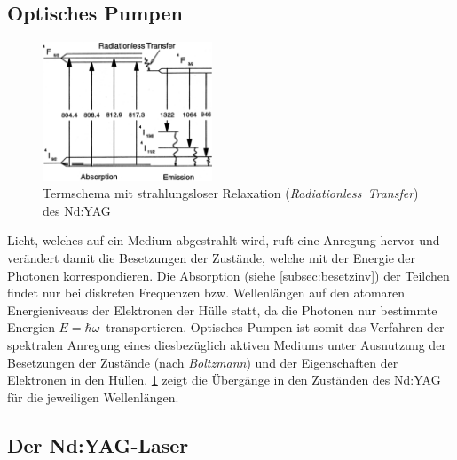 \documentclass[numbers=noenddot,12pt,a4paper]{scrartcl}
\newcommand{\tilt}[1]{\mbox{\textit{#1}}}
\begin{document}
\subsection{Optisches Pumpen}\label{subsec:optpump}
\begin{figure}
	\vspace{-0.75cm}
	\includegraphics[width=0.45\textwidth]{uebergaenge.png}
	\caption{Termschema mit strahlungsloser Relaxation (\tilt{Radiationless Transfer}) des Nd:YAG}\label{img:übergänge}
\end{figure}
Licht, welches auf ein Medium abgestrahlt wird, ruft eine Anregung hervor und verändert damit die Besetzungen der Zustände, welche mit der Energie der Photonen korrespondieren. Die Absorption (siehe \ref{subsec:besetzinv}) der Teilchen findet nur bei diskreten Frequenzen bzw. Wellenlängen auf den atomaren Energieniveaus der Elektronen der Hülle statt, da die Photonen nur bestimmte Energien $E=\hbar\omega\,$ transportieren. Optisches Pumpen ist somit das Verfahren der spektralen Anregung eines diesbezüglich aktiven Mediums unter Ausnutzung der Besetzungen der Zustände (nach \tilt{Boltzmann}) und der Eigenschaften der Elektronen in den Hüllen. \ref{img:übergänge} zeigt die Übergänge in den Zuständen des Nd:YAG für die jeweiligen Wellenlängen.
\subsection{Der Nd:YAG-Laser}\label{subsec:ndyag}
\end{document}
